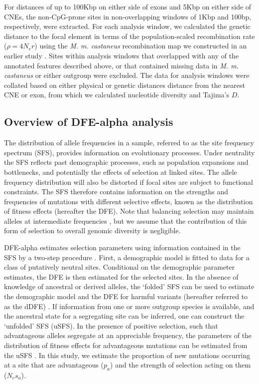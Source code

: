 	For distances of up to 100Kbp on either side of exons and 5Kbp on either side of CNEs, the non-CpG-prone sites in non-overlapping windows of 1Kbp and 100bp, respectively, were extracted. For each analysis window, we calculated the genetic distance to the focal element in terms of the population-scaled recombination rate ($\rho = 4N_er$) using the \textit{M. m. castaneus} recombination map we constructed in an earlier study \citep{RN340}. Sites within analysis windows that overlapped with any of the annotated features described above, or that contained missing data in \textit{M. m. castaneus} or either outgroup were excluded. The data for analysis windows were collated based on either physical or genetic distances distance from the nearest CNE or exon, from which we calculated nucleotide diversity and Tajima’s $D$.

\subsection{Overview of DFE-alpha analysis}

	The distribution of allele frequencies in a sample, referred to as the site frequency spectrum (SFS), provides information on evolutionary processes. Under neutrality the SFS reflects past demographic processes, such as population expansions and bottlenecks, and potentially the effects of selection at linked sites. The allele frequency distribution will also be distorted if focal sites are subject to functional constraints. The SFS therefore contains information on the strengths and frequencies of mutations with different selective effects, known as the distribution of fitness effects (hereafter the DFE). Note that balancing selection may maintain alleles at intermediate frequencies \citep{RN103}, but we assume that the contribution of this form of selection to overall genomic diversity is negligible.

	DFE-alpha estimates selection parameters using information contained in the SFS by a two-step procedure \citep{RN164}. First, a demographic model is fitted to data for a class of putatively neutral sites. Conditional on the demographic parameter estimates, the DFE is then estimated for the selected sites. In the absence of knowledge of ancestral or derived alleles, the ‘folded’ SFS can be used to estimate the demographic model and the DFE for harmful variants (hereafter referred to as the dDFE) \citep{RN164}. If information from one or more outgroup species is available, and the ancestral state for a segregating site can be inferred, one can construct the ‘unfolded’ SFS (uSFS). In the presence of positive selection, such that advantageous alleles segregate at an appreciable frequency, the parameters of the distribution of fitness effects for advantageous mutations can be estimated from the uSFS \citep{RN210, RN321, RN354}. In this study, we estimate the proportion of new mutations occurring at a site that are advantageous ($p_a$) and the strength of selection acting on them ($N_es_a$).

